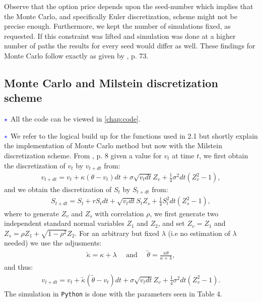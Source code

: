 \documentclass[12pt]{article}
\numberwithin{equation}{section}
\begin{document}
Observe that the option price depends upon the seed-number which implies that the
Monte Carlo, and specifically Euler discretization, scheme might not be precise enough.
Furthermore, we kept the number of simulations fixed, as requested. If this
constraint was lifted and simulation was done at a higher number of paths the
results for every seed would differ as well. These findings for Monte Carlo
follow exactly as given by
\cite{Havrylenko2024}, p. 73.
\newpage
\subsection{Monte Carlo and Milstein discretization scheme}
$\textcolor{blue}{\star}$ All the code can be viewed in \autoref{chap:code}.

$\textcolor{blue}{\star}$ We refer to the logical build up for the functions
used in 2.1 but shortly explain the implementation of Monte Carlo method but now with
the Milstein discretization scheme. From \cite{Rouah2024}, p. 8 given a value for
$v_t$ at time $t$, we first obtain the discretization of $v_t$ by $v_{t+dt}$ from:
\begin{align*}
    v_{t+dt} = v_t + \kappa(\theta - v_t)dt + \sigma \sqrt{v_tdt}Z_v+\frac{1}{4}\sigma^2dt\left (Z_v^2-1 \right ),
\end{align*}
and we obtain the discretization of $S_t$ by $S_{t+dt}$ from:
\begin{align*}
    S_{t+dt} = S_t + rS_tdt + \sqrt{v_t dt}S_tZ_s+\frac{1}{4}S_t^2dt(Z_s^2-1 ),
\end{align*}
where to generate $Z_v$ and $Z_s$ with correlation $\rho$, we first generate two independent standard normal variables $Z_1$ and $Z_2$, and set $Z_v = Z_1$ and $Z_s = \rho Z_1 + \sqrt{1 - \rho^2} Z_2$.
For an arbitrary but fixed $\lambda$ (i.e no estimation of $\lambda$ needed) we use the adjusments:
\begin{align*}
    \tilde{\kappa}=\kappa+\lambda \quad \text{ and } \quad \tilde{\theta}=\frac{\kappa\theta}{\kappa + \lambda},
\end{align*}
and thus:
\begin{align*}
    v_{t+dt} = v_t +\tilde{\kappa}(\tilde{\theta} - v_t)dt + \sigma \sqrt{v_tdt}Z_v+\frac{1}{4}\sigma^2dt\left (Z_v^2-1 \right ).
\end{align*}
The simulation in \texttt{Python} is done with the parameters seen in Table 4.
\end{document}

